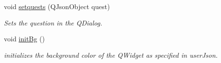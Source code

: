 \begin{DoxyCompactItemize}
void \hyperlink{classquests_a63b57d7fc7d4aa382da23d9a4592545e}{setquests} (Q\+Json\+Object quest)
\begin{DoxyCompactList}\small\item\em Sets the question in the Q\+Dialog. \end{DoxyCompactList}\item 
\mbox{\label{classquests_a16ce1db433118576119829773238ce9d}} 
void \hyperlink{classquests_a16ce1db433118576119829773238ce9d}{init\+Bg} ()
\begin{DoxyCompactList}\small\item\em initializes the background color of the Q\+Widget as specified in user\+Json. \end{DoxyCompactList}\end{DoxyCompactItemize}
